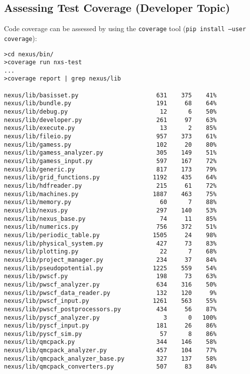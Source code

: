 \documentclass[oneside,11pt]{memoir}
\numberwithin{equation}{section}
\begin{document}
\subsection{Assessing Test Coverage (Developer Topic)}
Code coverage can be assessed by using the \texttt{coverage} tool 
(\texttt{pip install --user coverage}):
\begin{shaded}
\begin{verbatim}
>cd nexus/bin/
>coverage run nxs-test
...
>coverage report | grep nexus/lib

nexus/lib/basisset.py                      631    375    41%
nexus/lib/bundle.py                        191     68    64%
nexus/lib/debug.py                          12      6    50%
nexus/lib/developer.py                     261     97    63%
nexus/lib/execute.py                        13      2    85%
nexus/lib/fileio.py                        957    373    61%
nexus/lib/gamess.py                        102     20    80%
nexus/lib/gamess_analyzer.py               305    149    51%
nexus/lib/gamess_input.py                  597    167    72%
nexus/lib/generic.py                       817    173    79%
nexus/lib/grid_functions.py               1192    435    64%
nexus/lib/hdfreader.py                     215     61    72%
nexus/lib/machines.py                     1887    463    75%
nexus/lib/memory.py                         60      7    88%
nexus/lib/nexus.py                         297    140    53%
nexus/lib/nexus_base.py                     74     11    85%
nexus/lib/numerics.py                      756    372    51%
nexus/lib/periodic_table.py               1505     24    98%
nexus/lib/physical_system.py               427     73    83%
nexus/lib/plotting.py                       22      7    68%
nexus/lib/project_manager.py               234     37    84%
nexus/lib/pseudopotential.py              1225    559    54%
nexus/lib/pwscf.py                         198     73    63%
nexus/lib/pwscf_analyzer.py                634    316    50%
nexus/lib/pwscf_data_reader.py             132    120     9%
nexus/lib/pwscf_input.py                  1261    563    55%
nexus/lib/pwscf_postprocessors.py          434     56    87%
nexus/lib/pyscf_analyzer.py                  3      0   100%
nexus/lib/pyscf_input.py                   181     26    86%
nexus/lib/pyscf_sim.py                      57      8    86%
nexus/lib/qmcpack.py                       344    146    58%
nexus/lib/qmcpack_analyzer.py              457    104    77%
nexus/lib/qmcpack_analyzer_base.py         327    137    58%
nexus/lib/qmcpack_converters.py            507     83    84%

\end{verbatim}
\end{shaded}
\end{document}
